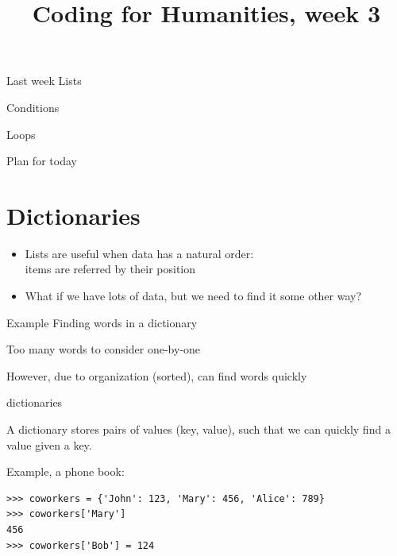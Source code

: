\documentclass[aspectratio=169,usenames,dvipsnames]{beamer}
\title{Coding for Humanities, week 3}
\begin{document}
\begin{frame}
 \titlepage
\end{frame}

\begin{frame}{Last week}
    Lists

    Conditions

    Loops
\end{frame}

\begin{frame}{Plan for today}
 \tableofcontents
\end{frame}


\section{Dictionaries}
\frame{\tableofcontents[currentsection]}

\begin{frame}
    \begin{itemize}
        \item Lists are useful when data has a natural order: \\
            items are referred by their position
        \pause
        \item What if we have lots of data,
            but we need to find it some other way?
    \end{itemize}

    \begin{block}{Example}
    Finding words in a dictionary

    Too many words to consider one-by-one

    However, due to organization (sorted), can find words quickly
    \end{block}
\end{frame}


\begin{frame}[fragile]{dictionaries}
    \begin{definition}
        A dictionary stores pairs of values (key, value),
        such that we can quickly find a value given a key.
    \end{definition}
Example, a phone book:
\begin{lstlisting}
>>> coworkers = {'John': 123, 'Mary': 456, 'Alice': 789}
>>> coworkers['Mary']
456
>>> coworkers['Bob'] = 124
\end{lstlisting}

\end{frame}
\end{document}
